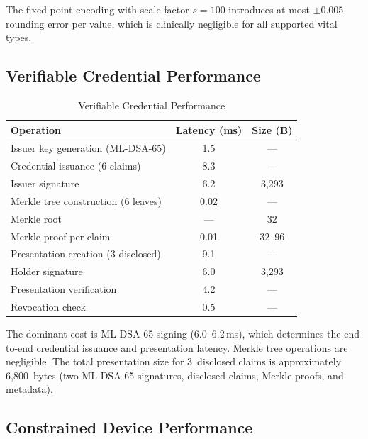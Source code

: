 \documentclass[conference,10pt]{IEEEtran}
\newcommand{\mldsa}{\textsf{ML-DSA}}
\begin{document}
The fixed-point encoding with scale factor $s = 100$ introduces at most $\pm 0.005$ rounding error per value, which is clinically negligible for all supported vital types.

\subsection{Verifiable Credential Performance}

\begin{table}[htbp]
\centering
\caption{Verifiable Credential Performance}
\label{tab:vc_perf}
\begin{tabular}{@{}lcc@{}}
\toprule
\textbf{Operation} & \textbf{Latency (ms)} & \textbf{Size (B)} \\
\midrule
Issuer key generation (\mldsa{}-65) & 1.5 & --- \\
Credential issuance (6 claims) & 8.3 & --- \\
Issuer signature & 6.2 & 3{,}293 \\
Merkle tree construction (6 leaves) & 0.02 & --- \\
Merkle root & --- & 32 \\
Merkle proof per claim & 0.01 & 32--96 \\
Presentation creation (3 disclosed) & 9.1 & --- \\
Holder signature & 6.0 & 3{,}293 \\
Presentation verification & 4.2 & --- \\
Revocation check & 0.5 & --- \\
\bottomrule
\end{tabular}
\end{table}

The dominant cost is \mldsa{}-65 signing (6.0--6.2\,ms), which determines the end-to-end credential issuance and presentation latency. Merkle tree operations are negligible. The total presentation size for 3~disclosed claims is approximately 6{,}800~bytes (two \mldsa{}-65 signatures, disclosed claims, Merkle proofs, and metadata).

\subsection{Constrained Device Performance}
\end{document}
